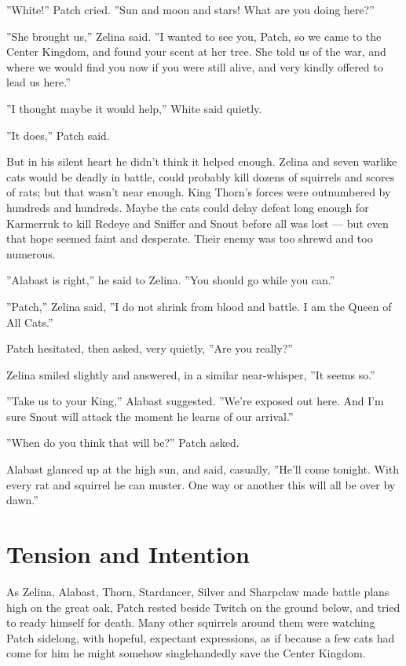 \documentclass[12pt]{book}
\begin{document}
''White!'' Patch cried. ''Sun and moon and stars! What are you doing
here?''

''She brought us,'' Zelina said. ''I wanted to see you, Patch, so we
came to the Center Kingdom, and found your scent at her tree. She told
us of the war, and where we would find you now if you were still
alive, and very kindly offered to lead us here.''

''I thought maybe it would help,'' White said quietly.

''It does,'' Patch said.

But in his silent heart he didn't think it helped enough. Zelina and
seven warlike cats would be deadly in battle, could probably kill
dozens of squirrels and scores of rats; but that wasn't near
enough. King Thorn's forces were outnumbered by hundreds and
hundreds. Maybe the cats could delay defeat long enough for Karmerruk
to kill Redeye and Sniffer and Snout before all was lost --- but even
that hope seemed faint and desperate. Their enemy was too shrewd and
too numerous.

''Alabast is right,'' he said to Zelina. ''You should go while you
can.''

''Patch,'' Zelina said, ''I do not shrink from blood and battle. I am
the Queen of All Cats.''

Patch hesitated, then asked, very quietly, ''Are you really?''

Zelina smiled slightly and answered, in a similar near-whisper, ''It
seems so.''

''Take us to your King,'' Alabast suggested. ''We're exposed out
here. And I'm sure Snout will attack the moment he learns of our
arrival.''

''When do you think that will be?'' Patch asked.

Alabast glanced up at the high sun, and said, casually, ''He'll come
tonight. With every rat and squirrel he can muster. One way or another
this will all be over by dawn.''


\section{Tension and Intention}

As Zelina, Alabast, Thorn, Stardancer, Silver and Sharpclaw made
battle plans high on the great oak, Patch rested beside Twitch on the
ground below, and tried to ready himself for death. Many other
squirrels around them were watching Patch sidelong, with hopeful,
expectant expressions, as if because a few cats had come for him he
might somehow singlehandedly save the Center Kingdom.
\end{document}
